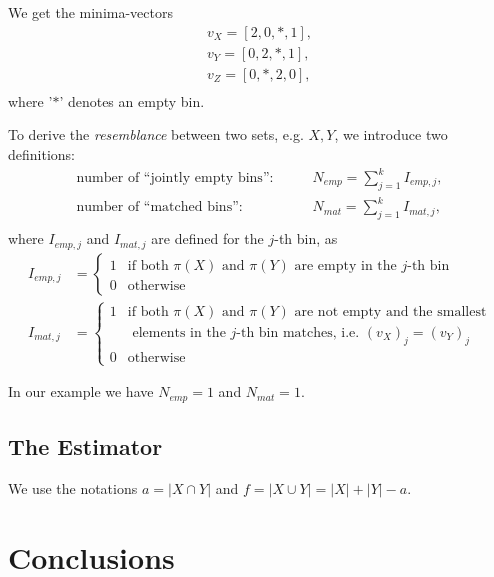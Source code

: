 \documentclass[a4paper]{article}
\begin{document}
We get the minima-vectors
\begin{equation}
\begin{split}
v_X=[2,0,*,1],\\
v_Y=[0,2,*,1],\\
v_Z=[0,*,2,0],\\
\end{split}
\end{equation}
where '$*$' denotes an empty bin.

To derive the \emph{resemblance} between two sets, e.g. $X,Y$, we introduce two definitions:
\begin{equation}
\begin{split}
\text{number of ``jointly empty bins'':} \qquad & N_{emp}=\sum_{j=1}^k I_{emp,j}, \\
\text{number of ``matched bins'':} \qquad & N_{mat}=\sum_{j=1}^k I_{mat,j},\\
\end{split}
\end{equation}
where $I_{emp,j}$ and $I_{mat,j}$ are defined for the $j$-th bin, as
\begin{equation}
\begin{split}
  I_{emp,j} &=\begin{cases}
    1 & \text{if both $\pi(X)$ and $\pi(Y)$ are empty in the $j$-th bin} \\
    0 & \text{otherwise}
  \end{cases}\\
  I_{mat,j} &=\begin{cases}
    1 & \text{if both $\pi(X)$ and $\pi(Y)$ are not empty and the smallest} \\
      & \text { elements in the $j$-th bin matches, i.e. $(v_X)_j=(v_Y)_j$} \\
    0 & \text{otherwise}
  \end{cases}
\end{split}
\end{equation}

In our example we have $N_{emp}=1$ and $N_{mat}=1$.

\subsection{The Estimator}

We use the notations $a=|X \cap Y|$ and $f=|X \cup Y|=|X|+|Y|-a$.


\section{Conclusions}




\end{document}

